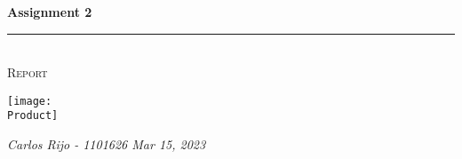 \documentclass[a4paper,11pt,twoside]{article}
\newcommand{\HRule}{\rule{\linewidth}{0.3mm}}                       %
\newcommand{\Logo}{logo.jpg}
\newcommand{\Product}{cover.jpg}
\newcommand{\Title}{Assignment 2}
\newcommand{\Subtitle}{Report}
\newcommand{\DocumentDate}{Mar 15, 2023}
\begin{document}
\begin{titlepage}
    \textcolor{ceiiablue}{\textbf{\Huge \Title}}\\                  %
    \HRule \\[0.2cm]
    \textsc{\Large \Subtitle}                                       %
    \vfill
    \begin{center}
        \texttt{[image: \\Product]}
    \end{center}

    {\raggedleft\vfill\itshape{
        Carlos Rijo - 1101626
        \newline
        \DocumentDate}
    }
\end{titlepage}

\clearpage

\tableofcontents
\newpage




%

\clearpage
% 
% 
\end{document}
